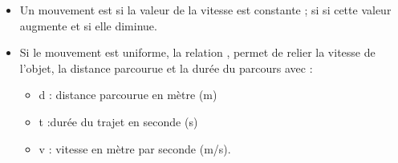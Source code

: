 \begin{mybilan}
	\begin{itemize}
		\item Un mouvement est  si la valeur de la vitesse est constante ;  si si cette valeur augmente et  si elle diminue. 
		\item Si le mouvement est uniforme, la relation , permet de relier la vitesse de l'objet, la distance parcourue et la durée du parcours avec :
			\begin{itemize}
				\item d : distance parcourue en mètre (m)
				\item t :durée du trajet en seconde (s)
				\item v : vitesse en mètre par seconde (m/s).
			\end{itemize}
	\end{itemize}
\end{mybilan}